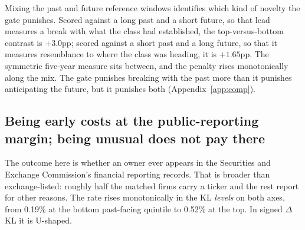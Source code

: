 \documentclass[11pt]{article}
\newcommand{\dkl}{$\Delta$KL}
\begin{document}
Mixing the past and future reference windows identifies which kind of
novelty the gate punishes. Scored against a long past and a short future,
so that lead measures a break with what the class had established, the
top-versus-bottom contrast is $+3.0$pp; scored against a short past and a
long future, so that it measures resemblance to where the class was
heading, it is $+1.65$pp. The symmetric five-year measure sits between, and
the penalty rises monotonically along the mix. The gate punishes breaking
with the past more than it punishes anticipating the future, but it
punishes both (Appendix~\ref{app:comp}).

\subsection{Being early costs at the public-reporting margin; being unusual does not pay there}\label{sec:bluesea}

The outcome here is whether an owner ever appears in the Securities and
Exchange Commission's financial reporting records. That is broader than
exchange-listed: roughly half the matched firms carry a ticker and the rest
report for other reasons. The rate rises monotonically in
the KL \emph{levels} on both axes, from 0.19\% at the bottom past-facing
quintile to 0.52\% at the top. In signed \dkl{} it is U-shaped.
\end{document}

